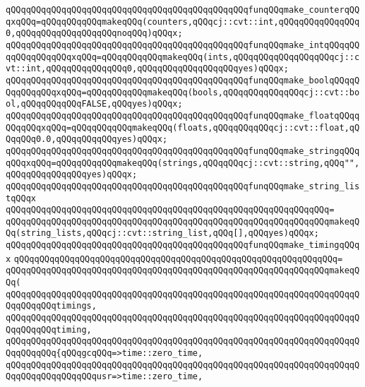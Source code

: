 \newline
\verb|qQQqqQQqqQQqqQQqqQQqqQQqqQQqqQQqqQQqqQQqqQQqqQQqfunqQQqmake_counterqQQqxqQQq=qQQqqQQqqQQqmakeqQQq(counters,qQQqcj::cvt::int,qQQqqQQqqQQqqQQq0,qQQqqQQqqQQqqQQqqQQqnoqQQq)qQQqx;|\newline
\verb|qQQqqQQqqQQqqQQqqQQqqQQqqQQqqQQqqQQqqQQqqQQqqQQqfunqQQqmake_intqQQqqQQqqQQqqQQqqQQqxqQQq=qQQqqQQqqQQqmakeqQQq(ints,qQQqqQQqqQQqqQQqqQQqcj::cvt::int,qQQqqQQqqQQqqQQq0,qQQqqQQqqQQqqQQqqQQqyes)qQQqx;|\newline
\verb|qQQqqQQqqQQqqQQqqQQqqQQqqQQqqQQqqQQqqQQqqQQqqQQqfunqQQqmake_boolqQQqqQQqqQQqqQQqxqQQq=qQQqqQQqqQQqmakeqQQq(bools,qQQqqQQqqQQqqQQqcj::cvt::bool,qQQqqQQqqQQqFALSE,qQQqyes)qQQqx;|\newline
\verb|qQQqqQQqqQQqqQQqqQQqqQQqqQQqqQQqqQQqqQQqqQQqqQQqfunqQQqmake_floatqQQqqQQqqQQqxqQQq=qQQqqQQqqQQqmakeqQQq(floats,qQQqqQQqqQQqcj::cvt::float,qQQqqQQq0.0,qQQqqQQqqQQqyes)qQQqx;|\newline
\verb|qQQqqQQqqQQqqQQqqQQqqQQqqQQqqQQqqQQqqQQqqQQqqQQqfunqQQqmake_stringqQQqqQQqxqQQq=qQQqqQQqqQQqmakeqQQq(strings,qQQqqQQqcj::cvt::string,qQQq"",qQQqqQQqqQQqqQQqyes)qQQqx;|\newline
\newline
\verb|qQQqqQQqqQQqqQQqqQQqqQQqqQQqqQQqqQQqqQQqqQQqqQQqfunqQQqmake_string_listqQQqx|\newline
\verb|qQQqqQQqqQQqqQQqqQQqqQQqqQQqqQQqqQQqqQQqqQQqqQQqqQQqqQQqqQQqqQQq=|\newline
\verb|qQQqqQQqqQQqqQQqqQQqqQQqqQQqqQQqqQQqqQQqqQQqqQQqqQQqqQQqqQQqqQQqmakeqQQq(string_lists,qQQqcj::cvt::string_list,qQQq[],qQQqyes)qQQqx;|\newline
\newline
\verb|qQQqqQQqqQQqqQQqqQQqqQQqqQQqqQQqqQQqqQQqqQQqqQQqfunqQQqmake_timingqQQqx|\newline
\verb|qQQqqQQqqQQqqQQqqQQqqQQqqQQqqQQqqQQqqQQqqQQqqQQqqQQqqQQqqQQqqQQq=|\newline
\verb|qQQqqQQqqQQqqQQqqQQqqQQqqQQqqQQqqQQqqQQqqQQqqQQqqQQqqQQqqQQqqQQqmakeqQQq(|\newline
\verb|qQQqqQQqqQQqqQQqqQQqqQQqqQQqqQQqqQQqqQQqqQQqqQQqqQQqqQQqqQQqqQQqqQQqqQQqqQQqqQQqtimings,|\newline
\verb|qQQqqQQqqQQqqQQqqQQqqQQqqQQqqQQqqQQqqQQqqQQqqQQqqQQqqQQqqQQqqQQqqQQqqQQqqQQqqQQqtiming,|\newline
\verb|qQQqqQQqqQQqqQQqqQQqqQQqqQQqqQQqqQQqqQQqqQQqqQQqqQQqqQQqqQQqqQQqqQQqqQQqqQQqqQQq{qQQqgcqQQq=>time::zero_time,|\newline
\verb|qQQqqQQqqQQqqQQqqQQqqQQqqQQqqQQqqQQqqQQqqQQqqQQqqQQqqQQqqQQqqQQqqQQqqQQqqQQqqQQqqQQqqQQqusr=>time::zero_time,|\newline
